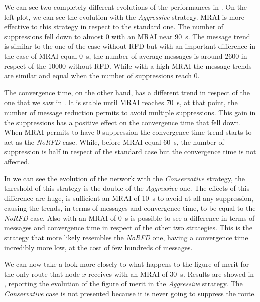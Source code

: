 We can see two completely different evolutions of the performances in .
On the left plot, we can see the evolution with the \textit{Aggressive} strategy.
\ac{MRAI} is more effective to this strategy in respect to the standard one.
The number of suppressions fell down to almost \num{0} with an \ac{MRAI} near
\SI{90}{\second}.
The message trend is similar to the one of the case without \ac{RFD} but with an
important difference in the case of  \ac{MRAI} equal \SI{0}{\second}, the number
of average messages is around \num{2600} in respect of the \num{10000} without
\ac{RFD}.
While with a high \ac{MRAI} the message trends are similar and equal when the number of
suppressions reach \num{0}.

The convergence time, on the other hand, has a different trend in respect of
the one that we saw in .
It is stable until \ac{MRAI} reaches \SI{70}{\second}, at that point, the number
of message reduction permits to avoid multiple suppressions.
This gain in the suppressions has a positive effect on the convergence time that
fell down.
When \ac{MRAI} permits to have \num{0} suppression the convergence time trend
starts to act as the \textit{NoRFD} case.
While, before \ac{MRAI} equal \SI{60}{\second}, the number of suppression is half
in respect of the standard case but the convergence time is not affected.

In  we can see the evolution of the network with the
\textit{Conservative} strategy, the threshold of this strategy is the double of
the \textit{Aggressive} one.
The effects of this difference are huge, is sufficient an \ac{MRAI} of \SI{10}{\second}
to avoid at all any suppression, causing the trends, in terms of messages and
convergence time, to be equal to the \textit{No\ac{RFD}} case.
Also with an \ac{MRAI} of \SI{0}{\second} is possible to see a difference in
terms of messages and convergence time in respect of the other two strategies.
This is the strategy that more likely resembles the \textit{NoRFD} one,
having a convergence time incredibly more low, at the cost of few hundreds of messages.

We can now take a look more closely to what happens to the figure of merit
for the only route that node $x$ receives with an \ac{MRAI} of \SI{30}{\second}.
Results are showed in , reporting
the evolution of the figure of merit in the \textit{Aggressive} strategy.
The \textit{Conservative} case is not presented because it is never going to suppress
the route.

